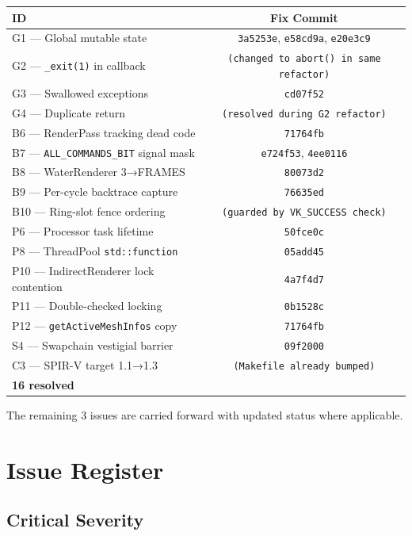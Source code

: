 \documentclass[a4paper,12pt]{article}
\begin{document}
\begin{center}
\begin{tabular}{lc}
\toprule
\textbf{ID} & \textbf{Fix Commit} \\
\midrule
G1 — Global mutable state & \texttt{3a5253e}, \texttt{e58cd9a}, \texttt{e20e3c9} \\
G2 — \texttt{\_exit(1)} in callback & \texttt{(changed to abort() in same refactor)} \\
G3 — Swallowed exceptions & \texttt{cd07f52} \\
G4 — Duplicate return & \texttt{(resolved during G2 refactor)} \\
B6 — RenderPass tracking dead code & \texttt{71764fb} \\
B7 — \texttt{ALL\_COMMANDS\_BIT} signal mask & \texttt{e724f53}, \texttt{4ee0116} \\
B8 — WaterRenderer 3→FRAMES & \texttt{80073d2} \\
B9 — Per-cycle backtrace capture & \texttt{76635ed} \\
B10 — Ring-slot fence ordering & \texttt{(guarded by VK\_SUCCESS check)} \\
P6 — Processor task lifetime & \texttt{50fce0c} \\
P8 — ThreadPool \texttt{std::function} & \texttt{05add45} \\
P10 — IndirectRenderer lock contention & \texttt{4a7f4d7} \\
P11 — Double-checked locking & \texttt{0b1528c} \\
P12 — \texttt{getActiveMeshInfos} copy & \texttt{71764fb} \\
S4 — Swapchain vestigial barrier & \texttt{09f2000} \\
C3 — SPIR-V target 1.1→1.3 & \texttt{(Makefile already bumped)} \\
\midrule
\textbf{16 resolved} & \\
\bottomrule
\end{tabular}
\end{center}

The remaining 3 issues are carried forward with updated status where applicable.

\newpage

\section{Issue Register}

\subsection{Critical Severity}
\end{document}
